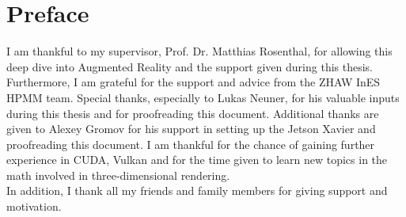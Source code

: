 \chapter*{Preface}
\label{sec:Vorwort}
I am thankful to my supervisor, Prof. Dr. Matthias Rosenthal, for allowing this deep dive into Augmented Reality and the support given during this thesis. Furthermore, I am grateful for the support and advice from the ZHAW InES HPMM team. Special thanks, especially to Lukas Neuner, for his valuable inputs during this thesis and for proofreading this document. Additional thanks are given to Alexey Gromov for his support in setting up the Jetson Xavier and proofreading this document. I am thankful for the chance of gaining further experience in CUDA, Vulkan and for the time given to learn new topics in the math involved in three-dimensional rendering. \\
In addition, I thank all my friends and family members for giving support and motivation.
